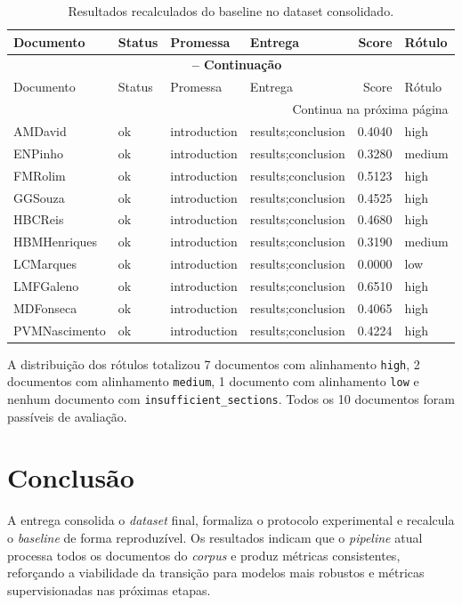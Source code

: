 \documentclass[12pt]{article}
\begin{document}
\begin{longtable}{llllrl}
    \caption{Resultados recalculados do baseline no dataset consolidado.} \label{tab:resultados} \\
    \toprule
    Documento & Status & Promessa & Entrega & Score & Rótulo \\
    \midrule
    \endfirsthead
    
    \multicolumn{6}{c}{{\bfseries \tablename\ \thetable{} -- Continuação}} \\
    \toprule
    Documento & Status & Promessa & Entrega & Score & Rótulo \\
    \midrule
    \endhead

    \midrule
    \multicolumn{6}{r}{{Continua na próxima página}} \\
    \bottomrule
    \endfoot

    \bottomrule
    \endlastfoot

    AMDavid & ok & introduction & results;conclusion & 0.4040 & high \\
    ENPinho & ok & introduction & results;conclusion & 0.3280 & medium \\
    FMRolim & ok & introduction & results;conclusion & 0.5123 & high \\
    GGSouza & ok & introduction & results;conclusion & 0.4525 & high \\
    HBCReis & ok & introduction & results;conclusion & 0.4680 & high \\
    HBMHenriques & ok & introduction & results;conclusion & 0.3190 & medium \\
    LCMarques & ok & introduction & results;conclusion & 0.0000 & low \\
    LMFGaleno & ok & introduction & results;conclusion & 0.6510 & high \\
    MDFonseca & ok & introduction & results;conclusion & 0.4065 & high \\
    PVMNascimento & ok & introduction & results;conclusion & 0.4224 & high \\
\end{longtable}

A distribuição dos rótulos totalizou 7 documentos com alinhamento \texttt{high}, 2 documentos com alinhamento \texttt{medium}, 1 documento com alinhamento \texttt{low} e nenhum documento com \texttt{insufficient\_sections}. Todos os 10 documentos foram passíveis de avaliação.

\section{Conclusão}

A entrega consolida o \textit{dataset} final, formaliza o protocolo experimental e recalcula o \textit{baseline} de forma reproduzível. Os resultados indicam que o \textit{pipeline} atual processa todos os documentos do \textit{corpus} e produz métricas consistentes, reforçando a viabilidade da transição para modelos mais robustos e métricas supervisionadas nas próximas etapas.
\end{document}
